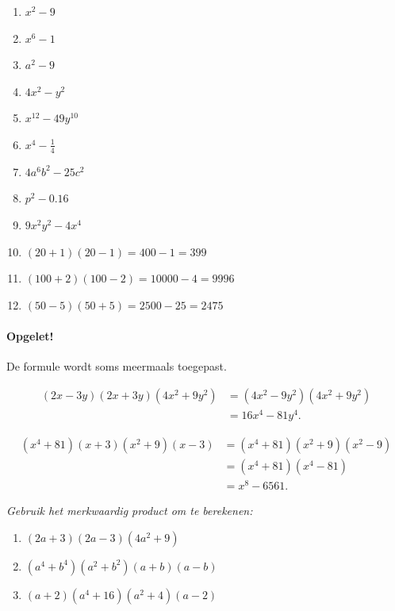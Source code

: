 \documentclass{bis}
\begin{document}
\begin{solution}
\begin{enumerate}
  \item \(x^2-9\)
  \item \(x^6-1\)
  \item \(a^2-9\)
  \item \(4x^2-y^2\)
  \item \(x^{12}-49y^{10}\)
  \item \(x^4-\tfrac{1}{4}\)
  \item \(4a^6b^2-25c^2\)
  \item \(p^2-0.16\)
  \item \(9x^2y^2-4x^4\)
  \item \((20+1)(20-1)=400-1=399\)
  \item \((100+2)(100-2)=10000-4=9996\)
  \item \((50-5)(50+5)=2500-25=2475\)
\end{enumerate}
\end{solution}

\paragraph*{Opgelet!} De formule wordt soms meermaals toegepast.

\begin{voorbeeld}
\[
\begin{aligned}
(2x-3y)(2x+3y)(4x^2+9y^2)
  &=(4x^2-9y^2)(4x^2+9y^2)\\
  &=16x^4-81y^4.
\end{aligned}
\]
\end{voorbeeld}

\begin{voorbeeld}
\[
\begin{aligned}
(x^4+81)(x+3)(x^2+9)(x-3)
  &=(x^4+81)(x^2+9)(x^2-9)\\
  &=(x^4+81)(x^4-81)\\
  &=x^8-6561.
\end{aligned}
\]
\end{voorbeeld}

\begin{exercise}
\emph{Gebruik het merkwaardig product om te berekenen:}
\begin{enumerate}
  \item \((2a+3)(2a-3)(4a^2+9)\)
  \item \((a^4+b^4)(a^2+b^2)(a+b)(a-b)\)
  \item \((a+2)(a^4+16)(a^2+4)(a-2)\)
\end{enumerate}
\end{exercise}
\end{document}
